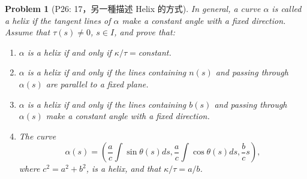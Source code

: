 \documentclass[10pt,a4paper]{article}
\newcounter{theProblemCounter}
\newtheorem{problem}[theProblemCounter]{Problem}
\begin{document}
\setcounter{theProblemCounter}{3}
\begin{problem}[P26: 17，另一種描述 Helix 的方式]
In general, a curve $\alpha$ is called a \emph{helix} if the tangent lines of $\alpha$ make a constant angle with a fixed direction. Assume that $\tau(s)\ne 0$, $s\in I$, and prove that:
\begin{enumerate}
\item[(a)] $\alpha$ is a helix if and only if $\kappa/\tau=$constant.
\item[(b)] $\alpha$ is a helix if and only if the lines containing $n(s)$ and passing through $\alpha(s)$ are parallel to a fixed plane.
\item[(c)] $\alpha$ is a helix if and only if the lines containing $b(s)$ and passing through $\alpha(s)$ make a constant angle with a fixed direction.
\item[(d)] The curve\[
\alpha(s)=\left(\frac{a}{c}\int \sin\theta(s) ds, \frac{a}{c}\int \cos\theta(s) ds, \frac{b}{c} s
\right),
\]
where $c^2=a^2+b^2$, is a helix, and that $\kappa/\tau=a/b$.
\end{enumerate}
\end{problem}
\end{document}
